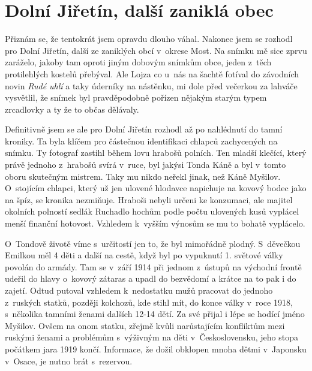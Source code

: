 
\chapter{Dolní Jiřetín, další zaniklá obec}

Přiznám se, že tentokrát jsem opravdu dlouho váhal. Nakonec jsem se rozhodl pro
Dolní Jiřetín, další ze zaniklých obcí v~okrese Most. Na snímku mě sice zprvu
zaráželo, jakoby tam oproti jiným dobovým snímkům obce, jeden z~těch
protilehlých kostelů přebýval. Ale Lojza co u~nás na šachtě fotíval do
závodních novin {\em Rudé uhlí} a taky úderníky na nástěnku, mi dole před
večerkou za lahváče vysvětlil, že snímek byl pravděpodobně pořízen nějakým
starým typem zrcadlovky a ty že to občas dělávaly.

Definitivně jsem se ale pro Dolní Jiřetín rozhodl až po nahlédnutí do tamní
kroniky. Ta byla klíčem pro částečnou identifikaci chlapců zachycených na
snímku. Ty fotograf zastihl během lovu hrabošů polních. Ten mladší klečící,
který právě jednoho z~hrabošů svírá v~ruce, byl jakýsi Tonda Káně a byl v~tomto
oboru skutečným mistrem. Taky mu nikdo neřekl jinak, než Káně Myšilov.
O~stojícím chlapci, který už jen ulovené hlodavce napichuje na kovový bodec
jako na špíz, se kronika nezmiňuje. Hraboši nebyli určeni ke konzumaci, ale
majitel okolních polností sedlák Ruchadlo hochům podle počtu ulovených kusů
vyplácel menší finanční hotovost. Vzhledem k~vyšším výnosům se mu to bohatě
vyplácelo.

O~Tondově životě víme s~určitostí jen to, že byl mimořádně plodný. S~děvečkou
Emilkou měl 4 děti a další na cestě, když byl po vypuknutí 1. světové války
povolán do armády. Tam se v~září 1914 při jednom z~ústupů na východní frontě
udeřil do hlavy o~kovový zátaras a upadl do bezvědomí a krátce na to pak i do
zajetí. Odtud putoval vzhledem k~nedostatku mužů pracovat do jednoho z~ruských
statků, později kolchozů, kde stihl mít, do konce války v~roce 1918, s~několika
tamními ženami dalších 12-14 dětí. Za své přijal i lépe se hodící jméno
Myšilov. Ovšem na onom statku, zřejmě kvůli narůstajícím konfliktům mezi
ruskými ženami a problémům s~výživným na děti v~Československu, jeho stopa
počátkem jara 1919 končí. Informace, že dožil obklopen mnoha dětmi v~Japonsku
v~Osace, je nutno brát s~rezervou.


